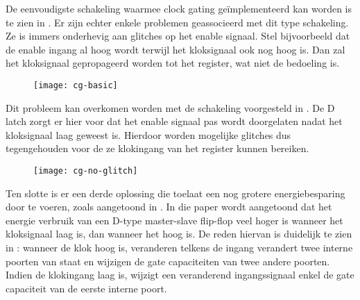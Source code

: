 De eenvoudigste schakeling waarmee clock gating ge\"implementeerd kan worden is te zien in . Er zijn echter enkele problemen geassocieerd met dit type schakeling. Ze is immers onderhevig aan glitches op het enable signaal. Stel bijvoorbeeld dat de enable ingang al hoog wordt terwijl het kloksignaal ook nog hoog is. Dan zal het kloksignaal gepropageerd worden tot het register, wat niet de bedoeling is.

\begin{figure}[h]
	\centering
		\texttt{[image: cg-basic]}
\end{figure}

Dit probleem kan overkomen worden met de schakeling voorgesteld in . De D latch zorgt er hier voor dat het enable signaal pas wordt doorgelaten nadat het kloksignaal laag geweest is. Hierdoor worden mogelijke glitches dus tegengehouden voor de ze klokingang van het register kunnen bereiken.

\begin{figure}[h]
	\centering
		\texttt{[image: cg-no-glitch]}
\end{figure}

Ten slotte is er een derde oplossing die toelaat een nog grotere energiebesparing door te voeren, zoals aangetoond in \cite{mueller}. In die paper wordt aangetoond dat het energie verbruik van een D-type master-slave flip-flop veel hoger is wanneer het kloksignaal laag is, dan wanneer het hoog is. De reden hiervan is duidelijk te zien in : wanneer de klok hoog is, veranderen telkens de ingang verandert twee interne poorten van staat en wijzigen de gate capaciteiten van twee andere poorten. Indien de klokingang laag is, wijzigt een veranderend ingangssignaal enkel de gate capaciteit van de eerste interne poort.

\begin{figure}[h]
	\centering
\end{figure}

